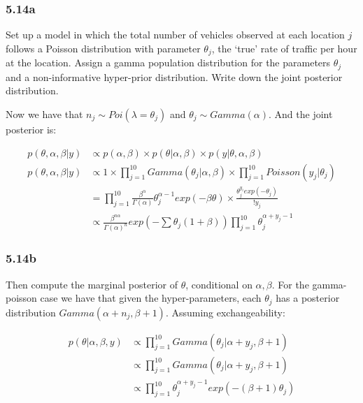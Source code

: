 \documentclass[]{article}
\begin{document}
\subsubsection{5.14a}\label{a-5}

Set up a model in which the total number of vehicles observed at each
location \(j\) follows a Poisson distribution with parameter
\(\theta_{j}\), the `true' rate of traffic per hour at the location.
Assign a gamma population distribution for the parameters \(\theta_{j}\)
and a non-informative hyper-prior distribution. Write down the joint
posterior distribution.

Now we have that \(n_{j} \sim Poi(\lambda =\theta_{j})\) and
\(\theta_{j} \sim Gamma(\alpha)\). And the joint posterior is:

\[
\begin{aligned}
p(\theta,\alpha,\beta|y) &\propto p(\alpha, \beta) \times p(\theta|\alpha, \beta) \times p(y|\theta,\alpha, \beta) \nonumber \\ 
p(\theta,\alpha,\beta|y) &\propto 1\times \prod_{j=1}^{10}Gamma(\theta_{j} | \alpha, \beta) \times \prod_{j=1}^{10}Poisson(y_{j}|\theta_{j}) \nonumber \\
&= \prod_{j=1}^{10}\frac{\beta^{\alpha}}{\Gamma(\alpha)}\theta_{j}^{\alpha-1}exp(-\beta \theta) \times \frac{\theta_{j}^{y_{i}}exp(-\theta_{j})}{!y_{j}} \nonumber \\
&\propto \frac{\beta^{n\alpha}}{\Gamma(\alpha)^{n}}exp(-\sum \theta_{j}( 1 + \beta )) \prod_{j=1}^{10} \theta_{j}^{\alpha + y_{j}-1} \label{bic.joint.post2}
\end{aligned}
\]

\subsubsection{5.14b}\label{b-4}

Then compute the marginal posterior of \(\theta\), conditional on
\(\alpha, \beta\). For the gamma-poisson case we have that given the
hyper-parameters, each \(\theta_{j}\) has a posterior distribution
\(Gamma(\alpha + n_{j}, \beta +1)\). Assuming exchangeability:

\[
\begin{aligned}
p(\theta|\alpha,\beta,y) &\propto \prod_{j=1}^{10}Gamma(\theta_{j} | \alpha +y_{j}, \beta+1) \nonumber \\
&\propto \prod_{j=1}^{10}Gamma(\theta_{j} | \alpha +y_{j}, \beta+1) \nonumber \\
&\propto \prod_{j=1}^{10} \theta_{j}^{\alpha + y_{j} -1}exp(-(\beta+1) \theta_{j})
\label{bic.cond.post.theta2}
\end{aligned}
\]
\end{document}
